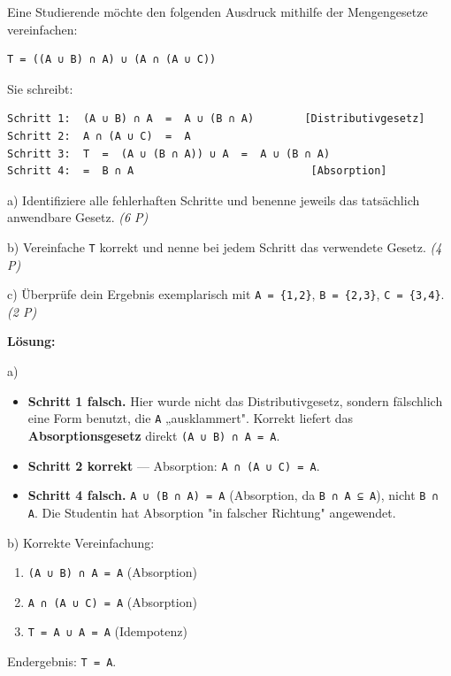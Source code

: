 \documentclass[11pt, a4paper]{article}
\begin{document}
Eine Studierende möchte den folgenden Ausdruck mithilfe der Mengengesetze vereinfachen:


\begin{lstlisting}
T = ((A ∪ B) ∩ A) ∪ (A ∩ (A ∪ C))
\end{lstlisting}


Sie schreibt:


\begin{lstlisting}
Schritt 1:  (A ∪ B) ∩ A  =  A ∪ (B ∩ A)        [Distributivgesetz]
Schritt 2:  A ∩ (A ∪ C)  =  A
Schritt 3:  T  =  (A ∪ (B ∩ A)) ∪ A  =  A ∪ (B ∩ A)
Schritt 4:  =  B ∩ A                            [Absorption]
\end{lstlisting}


a) Identifiziere alle fehlerhaften Schritte und benenne jeweils das tatsächlich anwendbare Gesetz. \textit{(6 P)}


b) Vereinfache \texttt{T} korrekt und nenne bei jedem Schritt das verwendete Gesetz. \textit{(4 P)}


c) Überprüfe dein Ergebnis exemplarisch mit \texttt{A = \{1,2\}}, \texttt{B = \{2,3\}}, \texttt{C = \{3,4\}}. \textit{(2 P)}


\textbf{Lösung:}


a)

\begin{itemize}
  \item \textbf{Schritt 1 falsch.} Hier wurde nicht das Distributivgesetz, sondern fälschlich eine Form benutzt, die \texttt{A} „ausklammert". Korrekt liefert das \textbf{Absorptionsgesetz} direkt \texttt{(A ∪ B) ∩ A = A}.
  \item \textbf{Schritt 2 korrekt} — Absorption: \texttt{A ∩ (A ∪ C) = A}.
  \item \textbf{Schritt 4 falsch.} \texttt{A ∪ (B ∩ A) = A} (Absorption, da \texttt{B ∩ A ⊆ A}), nicht \texttt{B ∩ A}. Die Studentin hat Absorption "in falscher Richtung" angewendet.
\end{itemize}

b) Korrekte Vereinfachung:

\begin{enumerate}
  \item \texttt{(A ∪ B) ∩ A = A} (Absorption)
  \item \texttt{A ∩ (A ∪ C) = A} (Absorption)
  \item \texttt{T = A ∪ A = A} (Idempotenz)
\end{enumerate}

Endergebnis: \texttt{T = A}.
\end{document}
